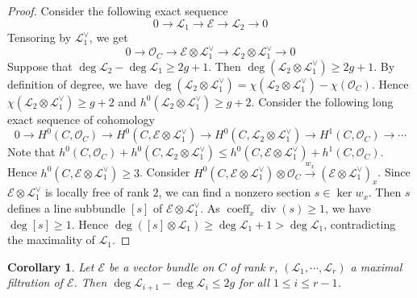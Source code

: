 \documentclass{ctexart}
\newtheorem{corollary}{Corollary}[section]
\newcommand{\divisor}{\operatorname{div}}
\newcommand{\coefficient}{\operatorname{coeff}}
\begin{document}
\begin{proof}
    Consider the following exact sequence
    \begin{equation}
        0 \longrightarrow \mathcal{L}_{1} \longrightarrow \mathcal{E} \longrightarrow \mathcal{L}_{2} \longrightarrow 0
    \end{equation}
    Tensoring by $\mathcal{L}_{1}^{\vee}$, we get
    \begin{equation}
        0 \longrightarrow \mathcal{O}_{C} \longrightarrow \mathcal{E} \otimes \mathcal{L}_{1}^{\vee} \longrightarrow \mathcal{L}_{2} \otimes \mathcal{L}_{1}^{\vee} \longrightarrow 0
    \end{equation}
    Suppose that $\deg \mathcal{L}_{2} - \deg \mathcal{L}_{1} \ge 2g + 1$.
    Then $\deg (\mathcal{L}_{2} \otimes \mathcal{L}_{1}^{\vee}) \ge 2g + 1$.
    By definition of degree, we have $\deg (\mathcal{L}_{2} \otimes \mathcal{L}_{1}^{\vee}) = \chi(\mathcal{L}_{2} \otimes \mathcal{L}_{1}^{\vee}) - \chi(\mathcal{O}_{C})$.
    Hence $\chi(\mathcal{L}_{2} \otimes \mathcal{L}_{1}^{\vee}) \ge g + 2$ and $h^{0}(\mathcal{L}_{2} \otimes \mathcal{L}_{1}^{\vee}) \ge g + 2$.
    Consider the following long exact sequence of cohomology
    \begin{equation}
        0 \rightarrow H^{0}(C, \mathcal{O}_{C}) \rightarrow H^{0}(C, \mathcal{E} \otimes \mathcal{L}_{1}^{\vee}) \rightarrow H^{0}(C, \mathcal{L}_{2} \otimes \mathcal{L}_{1}^{\vee}) \rightarrow H^{1}(C, \mathcal{O}_{C}) \rightarrow \cdots
    \end{equation}
    Note that $h^{0}(C, \mathcal{O}_{C}) + h^{0}(C, \mathcal{L}_{2} \otimes \mathcal{L}_{1}^{\vee}) \le h^{0}(C, \mathcal{E} \otimes \mathcal{L}_{1}^{\vee}) + h^{1}(C, \mathcal{O}_{C})$.
    Hence $h^{0}(C, \mathcal{E} \otimes \mathcal{L}_{1}^{\vee}) \ge 3$.
    Consider $H^{0}(C, \mathcal{E} \otimes \mathcal{L}_{1}^{\vee}) \otimes \mathcal{O}_{C} \overset{w_{x}}{\rightarrow} (\mathcal{E} \otimes \mathcal{L}_{1}^{\vee})_{x}$.
    Since $\mathcal{E} \otimes \mathcal{L}_{1}^{\vee}$ is locally free of rank $2$, we can find a nonzero section $s\in \ker w_{x}$.
    Then $s$ defines a line subbundle $[s]$ of $\mathcal{E} \otimes \mathcal{L}_{1}^{\vee}$.
    As $\coefficient_{x} \divisor (s) \ge 1$, we have $\deg [s] \ge 1$.
    Hence $\deg ([s] \otimes \mathcal{L}_{1}) \ge \deg \mathcal{L}_{1} + 1 > \deg \mathcal{L}_{1}$, contradicting the maximality of $\mathcal{L}_{1}$.
\end{proof}
\begin{corollary}
    Let $\mathcal{E}$ be a vector bundle on $C$ of rank $r$, $(\mathcal{L}_{1}, \cdots, \mathcal{L}_{r})$ a maximal filtration of $\mathcal{E}$.
    Then $\deg \mathcal{L}_{i + 1} - \deg \mathcal{L}_{i} \le 2g$ for all $1 \le i \le r - 1$.
    \label{Corollary 5.3}
\end{corollary}
\end{document}
